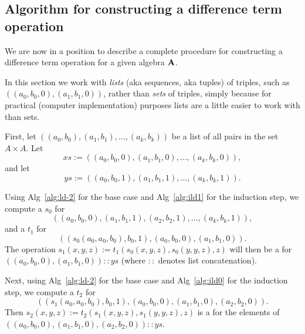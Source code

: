 \subsection{Algorithm for constructing a difference term operation}
\label{sec:algor-2}
We are now in a position to describe a complete procedure for constructing
a difference term operation for a given algebra $\mathbf{A}$.

In this section we work with \emph{lists}
(aka sequences, aka tuples) of triples,
such as $((a_0, b_0, 0), (a_1, b_1, 0))$, rather than \emph{sets} of triples,
simply because for practical (computer implementation) purposes lists are a little
easier to work with than sets.

First, let
$((a_0, b_0), (a_1, b_1), \dots, (a_k, b_k))$
be a list of all pairs in the set $A\times A$.
Let
\begin{equation*}
xs := %
((a_0, b_0, 0), (a_1, b_1, 0), \dots, (a_k, b_k, 0)),
\end{equation*}
and let
\begin{equation*}
ys := %
((a_0, b_0, 1), (a_1, b_1, 1), \dots, (a_k, b_k, 1)).
\end{equation*}


Using Alg~\ref{alg:ld-2} for the base case
and Alg~\ref{alg:ild1}
for the induction step,
we compute a \ldto $s_0$ for
\begin{equation*}
((a_0, b_0, 0), (a_1, b_1, 1), (a_2, b_2, 1), \dots, (a_k, b_k, 1)),
\end{equation*}
and a \ldto $t_1$ for
\begin{equation*}
((s_0(a_0, a_0, b_0), b_0, 1), (a_0, b_0, 0),(a_1, b_1, 0)).
\end{equation*}
The operation $s_1(x,y,z) := t_1(s_0(x,y,z), s_0(y,y,z), z)$ will then be
a \ldto for
$((a_0, b_0, 0), (a_1, b_1, 0)) :: ys$  (where $::$ denotes
list concatenation).

Next, using Alg~\ref{alg:ld-2} for the base case
and Alg~\ref{alg:ild0} for the induction step,
we compute a \ldto $t_2$ for
\begin{equation*}
((s_1(a_0, a_0, b_0), b_0, 1), (a_0, b_0, 0),(a_1, b_1, 0),(a_2, b_2, 0)).
\end{equation*}
Then $s_2(x,y,z) := t_2(s_1(x,y,z), s_1(y,y,z), z)$ is a \ldto
for the elements of
$((a_0, b_0, 0), (a_1, b_1, 0), (a_2, b_2, 0)) :: ys$.

